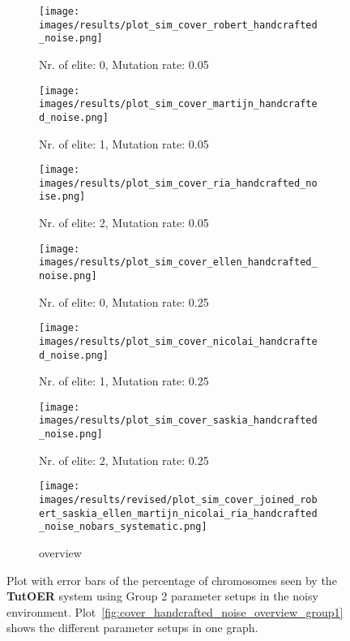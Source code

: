 \begin{figure}[ht]
	\begin{subfigure}{0.48\linewidth}
	\texttt{[image: images/results/plot\_sim\_cover\_robert\_handcrafted\_noise.png]}
	\caption{Nr. of elite: 0, Mutation rate: 0.05}
	\label{fig:cover_handcrafted_noise_robert}
	\end{subfigure}
	\hfill
	\begin{subfigure}{0.48\linewidth}
	\texttt{[image: images/results/plot\_sim\_cover\_martijn\_handcrafted\_noise.png]}
	\caption{Nr. of elite: 1, Mutation rate: 0.05}
	\label{fig:cover_handcrafted_noise_martijn}
	\end{subfigure}
	\begin{subfigure}{0.48\linewidth}
	\texttt{[image: images/results/plot\_sim\_cover\_ria\_handcrafted\_noise.png]}
	\caption{Nr. of elite: 2, Mutation rate: 0.05}
	\label{fig:cover_handcrafted_noise_ria}
	\end{subfigure}
	\hfill
	\begin{subfigure}{0.48\linewidth}
	\texttt{[image: images/results/plot\_sim\_cover\_ellen\_handcrafted\_noise.png]}
	\caption{Nr. of elite: 0, Mutation rate: 0.25}
	\label{fig:cover_handcrafted_noise_ellen}
	\end{subfigure}
	\begin{subfigure}{0.48\linewidth}
	\texttt{[image: images/results/plot\_sim\_cover\_nicolai\_handcrafted\_noise.png]}
	\caption{Nr. of elite: 1, Mutation rate: 0.25}
	\label{fig:cover_handcrafted_noise_nicolai}
	\end{subfigure}
	\hfill
	\begin{subfigure}{0.48\linewidth}
	\texttt{[image: images/results/plot\_sim\_cover\_saskia\_handcrafted\_noise.png]}
	\caption{Nr. of elite: 2, Mutation rate: 0.25}
	\label{fig:cover_handcrafted_noise_saskia}
	\end{subfigure}
	\begin{subfigure}{\linewidth}
	\texttt{[image: images/results/revised/plot\_sim\_cover\_joined\_robert\_saskia\_ellen\_martijn\_nicolai\_ria\_handcrafted\_noise\_nobars\_systematic.png]}
	\caption{overview}
	\label{fig:cover_handcrafted_noise_overview_group2}
	\end{subfigure}
	\caption[Percentage chromosomes seen in noisy simulated environment for
	group 1]{Plot with error bars of the percentage of chromosomes seen by the \textbf{TutOER}
	system using Group 2 parameter setups in the noisy environment.
	Plot~\ref{fig:cover_handcrafted_noise_overview_group1} shows the
	different parameter setups in one graph.}
	\label{fig:cover_handcrafted_noise_container_group2}
\end{figure}
